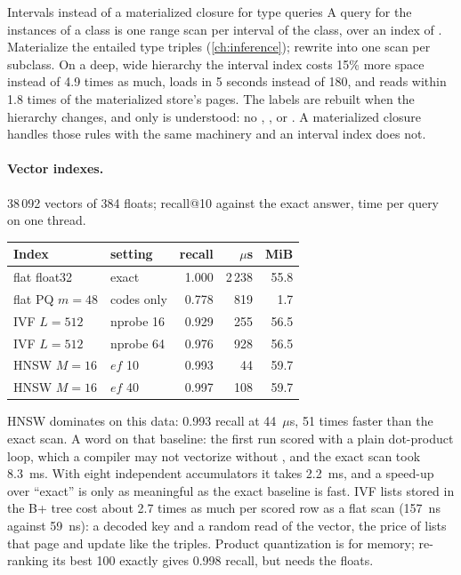 \begin{decision}{Intervals instead of a materialized closure for type queries}
 A query for the instances of a class is one range scan per interval
of the class, over an index of .
 Materialize the entailed type triples (\cref{ch:inference});
rewrite into one scan per subclass.
 On a deep, wide hierarchy the interval index costs 15\% more space
instead of 4.9 times as much, loads in 5 seconds instead of 180, and reads within 1.8
times of the materialized store's pages.
 The labels are rebuilt when the hierarchy changes, and only
 is understood: no , , or
. A materialized closure handles those rules with the same machinery
and an interval index does not.
\end{decision}

\paragraph{Vector indexes.} 38\,092 vectors of 384 floats; recall@10 against the exact
answer, time per query on one thread.

\begin{center}
\small
\begin{tabular}{@{}llrrr@{}}
\toprule
Index & setting & recall & $\mu$s & MiB \\
\midrule
flat float32 & exact & 1.000 & 2\,238 & 55.8 \\
flat PQ $m{=}48$ & codes only & 0.778 & 819 & 1.7 \\
IVF $L{=}512$ & nprobe 16 & 0.929 & 255 & 56.5 \\
IVF $L{=}512$ & nprobe 64 & 0.976 & 928 & 56.5 \\
HNSW $M{=}16$ & $ef$ 10 & 0.993 & 44 & 59.7 \\
HNSW $M{=}16$ & $ef$ 40 & 0.997 & 108 & 59.7 \\
\bottomrule
\end{tabular}
\end{center}

HNSW dominates on this data: 0.993 recall at 44~$\mu$s, 51 times faster than the
exact scan. A word on that baseline: the first run scored with a plain dot-product
loop, which a compiler may not vectorize without , and the exact
scan took 8.3~ms. With eight independent accumulators it takes 2.2~ms, and a
speed-up over ``exact'' is only as meaningful as the exact baseline is fast. IVF
lists stored in the B+ tree cost about 2.7 times as much per scored row as a flat
scan (157~ns against 59~ns): a decoded key and a random read of the vector, the
price of lists that page and update like the triples. Product quantization is for
memory; re-ranking its best 100 exactly gives 0.998 recall, but needs the floats.

